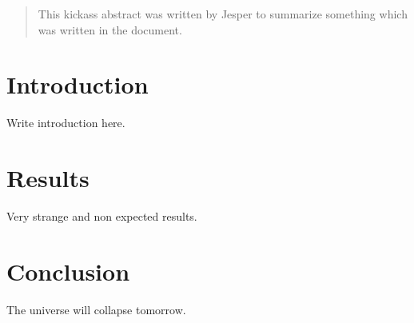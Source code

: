 \documentclass{article}
\begin{document}
\begin{abstract}
This kickass abstract was written by Jesper to summarize something which was written in the document.
\end{abstract}

\section{Introduction}

Write introduction here.

\section{Results}

Very strange and non expected results.  

\section{Conclusion}

The universe will collapse tomorrow.
\end{document}
